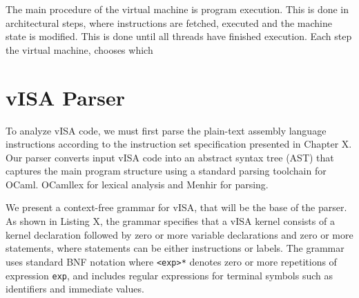 The main procedure of the virtual machine is program execution. This is done in
architectural steps, where instructions are fetched, executed and the machine
state is modified. This is done until all threads have finished execution. Each
step the virtual machine, chooses which

\section{vISA Parser}

To analyze vISA code, we must first parse the plain-text assembly language
instructions according to the instruction set specification presented in
Chapter X. Our parser converts input vISA code into an abstract syntax tree
(AST) that captures the main program structure using a standard parsing
toolchain for OCaml. OCamllex for lexical analysis and Menhir for parsing.

We present a context-free grammar for vISA, that will be the base of the
parser. As shown in Listing X, the grammar specifies that a vISA kernel
consists of a kernel declaration followed by zero or more variable declarations
and zero or more statements, where statements can be either instructions or
labels. The grammar uses standard BNF notation where \lstinline{<exp>*} denotes
zero or more repetitions of expression \lstinline{exp}, and includes regular
expressions for terminal symbols such as identifiers and immediate values.

